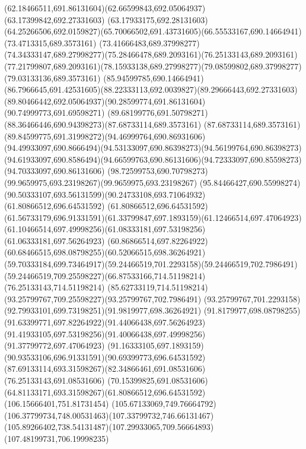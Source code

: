 {{		\curveto(62.18466511,691.86131604)(62.66599843,692.05064937)(63.17399842,692.27331603)
		\lineto(63.17933175,692.28131603)
		\curveto(64.25266506,692.0159827)(65.70066502,691.43731605)(66.55533167,690.14664941)
		\lineto(73.4713315,689.3573161)
		\lineto(73.41666483,689.37998277)
		\curveto(74.34333147,689.27998277)(75.28466478,689.2093161)(76.25133143,689.2093161)
		\curveto(77.21799807,689.2093161)(78.15933138,689.27998277)(79.08599802,689.37998277)
		\lineto(79.03133136,689.3573161)
		\lineto(85.94599785,690.14664941)
		\curveto(86.7966645,691.42531605)(88.22333113,692.0039827)(89.29666443,692.27331603)
		\curveto(89.80466442,692.05064937)(90.28599774,691.86131604)(90.74999773,691.69598271)
		\curveto(89.68199776,691.50798271)(88.36466446,690.94398273)(87.68733114,689.3573161)
		\curveto(87.68733114,689.3573161)(89.84599775,691.31998272)(94.46999764,690.86931606)
		\curveto(94.49933097,690.8666494)(94.53133097,690.86398273)(94.56199764,690.86398273)
		\curveto(94.61933097,690.8586494)(94.66599763,690.86131606)(94.72333097,690.85598273)
		\lineto(94.70333097,690.86131606)
		\curveto(98.72599753,690.70798273)(99.9659975,693.23198267)(99.9659975,693.23198267)
		\curveto(95.84466427,690.55998274)(90.50333107,693.56131599)(90.24733108,693.71064932)
		\moveto(61.80866512,696.64531592)
		\lineto(61.80866512,696.64531592)
		\curveto(61.56733179,696.91331591)(61.33799847,697.1893159)(61.12466514,697.47064923)
		\curveto(61.10466514,697.49998256)(61.08333181,697.53198256)(61.06333181,697.56264923)
		\curveto(60.86866514,697.82264922)(60.68466515,698.08798255)(60.52066515,698.36264921)
		\curveto(59.70333184,699.73464917)(59.24466519,701.2293158)(59.24466519,702.7986491)
		\curveto(59.24466519,709.25598227)(66.87533166,714.51198214)(76.25133143,714.51198214)
		\curveto(85.62733119,714.51198214)(93.25799767,709.25598227)(93.25799767,702.7986491)
		\curveto(93.25799767,701.2293158)(92.79933101,699.73198251)(91.9819977,698.36264921)
		\curveto(91.8179977,698.08798255)(91.63399771,697.82264922)(91.44066438,697.56264923)
		\curveto(91.41933105,697.53198256)(91.40066438,697.49998256)(91.37799772,697.47064923)
		\curveto(91.16333105,697.1893159)(90.93533106,696.91331591)(90.69399773,696.64531592)
		\curveto(87.69133114,693.31598267)(82.34866461,691.08531606)(76.25133143,691.08531606)
		\curveto(70.15399825,691.08531606)(64.81133171,693.31598267)(61.80866512,696.64531592)
		\moveto(106.15666401,751.81731454)
		\curveto(105.67133069,749.76664792)(106.37799734,748.00531463)(107.33799732,746.66131467)
		\curveto(105.89266402,738.54131487)(107.29933065,709.56664893)(107.48199731,706.19998235)
}}
